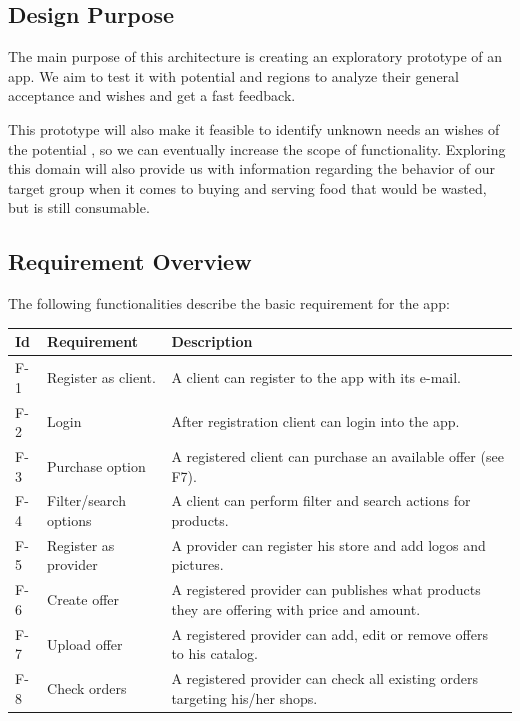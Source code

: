 \subsection{Design Purpose}

The main purpose of this architecture is creating an exploratory prototype of an \gls{app}. We aim to test it with potential 
 and regions to analyze their general acceptance and wishes \cite{refbook:DSHC} and get a fast feedback. 

This prototype will also make it feasible to identify unknown needs an wishes of the potential , so we 
can eventually increase the scope of functionality. Exploring this domain will also provide us with information regarding 
the behavior of our target group when it comes to buying and serving food that would be wasted, but is still consumable.

\subsection{Requirement Overview} \label{Requirement_Overview}

The following functionalities describe the basic requirement for the \gls{app}:

\begin{table}[H]
    \begin{tabularx}{\textwidth}{llX}
    \toprule
    Id & Requirement & Description  \\
    \midrule
    F-1 & Register as \gls{client}. & A \gls{client} can register to the app with its e-mail.\\
    F-2 & Login & After registration \gls{client} can login into the app. \\
    F-3 & Purchase option & A registered \gls{client} can purchase an available offer (see F7).\\
    F-4 & Filter/search options & A \gls{client} can perform filter and search actions for products.\\
    F-5 & Register as \gls{provider} & A \gls{provider} can register his store and add logos and pictures.\\
    F-6 & Create offer & A registered \gls{provider} can publishes what products they are offering with price 
    and amount. \\
    F-7 & Upload offer & A registered \gls{provider} can add, edit or remove offers to his catalog.\\
    F-8 & Check orders & A registered \gls{provider} can check all existing orders targeting his/her shops.\\
    \bottomrule
    \end{tabularx}
\end{table}

